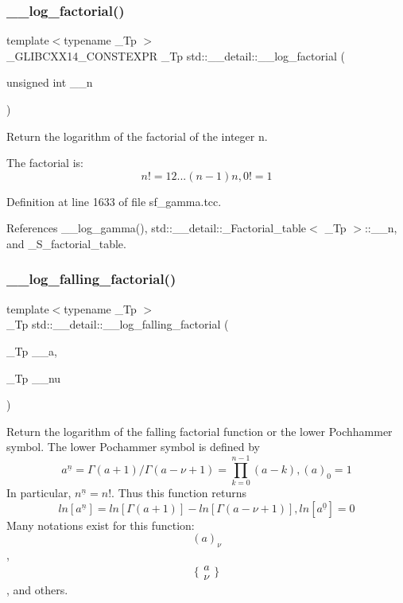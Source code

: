 \subsubsection{\texorpdfstring{\+\_\+\+\_\+log\+\_\+factorial()}{\_\_log\_factorial()}}
{\footnotesize\ttfamily template$<$typename \+\_\+\+Tp $>$ \\
\+\_\+\+G\+L\+I\+B\+C\+X\+X14\+\_\+\+C\+O\+N\+S\+T\+E\+X\+PR \+\_\+\+Tp std\+::\+\_\+\+\_\+detail\+::\+\_\+\+\_\+log\+\_\+factorial (\begin{DoxyParamCaption}\item[{unsigned int}]{\+\_\+\+\_\+n }\end{DoxyParamCaption})}



Return the logarithm of the factorial of the integer n. 

The factorial is\+: \[ n! = 1 2 ... (n-1) n, 0! = 1 \] 

Definition at line 1633 of file sf\+\_\+gamma.\+tcc.



References \+\_\+\+\_\+log\+\_\+gamma(), std\+::\+\_\+\+\_\+detail\+::\+\_\+\+Factorial\+\_\+table$<$ \+\_\+\+Tp $>$\+::\+\_\+\+\_\+n, and \+\_\+\+S\+\_\+factorial\+\_\+table.

\mbox{\label{namespacestd_1_1____detail_abc3aa91fde134d9f01be8fc8e7c7cc79}} 
\subsubsection{\texorpdfstring{\+\_\+\+\_\+log\+\_\+falling\+\_\+factorial()}{\_\_log\_falling\_factorial()}}
{\footnotesize\ttfamily template$<$typename \+\_\+\+Tp $>$ \\
\+\_\+\+Tp std\+::\+\_\+\+\_\+detail\+::\+\_\+\+\_\+log\+\_\+falling\+\_\+factorial (\begin{DoxyParamCaption}\item[{\+\_\+\+Tp}]{\+\_\+\+\_\+a,  }\item[{\+\_\+\+Tp}]{\+\_\+\+\_\+nu }\end{DoxyParamCaption})}



Return the logarithm of the falling factorial function or the lower Pochhammer symbol. The lower Pochammer symbol is defined by \[ a^{\underline{n}} = \Gamma(a + 1) / \Gamma(a - \nu + 1) = \prod_{k=0}^{n-1} (a - k), (a)_0 = 1 \] In particular, $ n^{\underline{n}} = n! $. Thus this function returns \[ ln[a^{\underline{n}}] = ln[\Gamma(a + 1)] - ln[\Gamma(a - \nu + 1)], ln[a^{\underline{0}}] = 0 \] Many notations exist for this function\+: \[ (a)_\nu \], \[ \{ \begin{array}{c} a \\ \nu \end{array} \} \], and others. 



